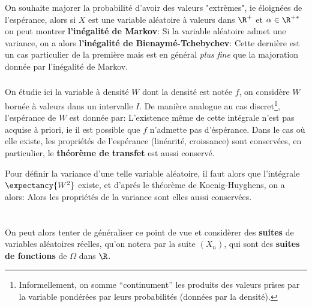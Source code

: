 \subsection*{}
On souhaite majorer la probabilité d'avoir des valeurs "extrèmes", ie éloignées de l'espérance, alors si \(X\) est une variable aléatoire à valeurs dans \(\R^+\) et \(\alpha \in \R^{+*}\) on peut montrer \textbf{l'inégalité de Markov}:
Si la variable aléatoire admet une variance, on a alors \textbf{l'inégalité de Bienaymé-Tchebychev}:
Cette dernière est un cas particulier de la première mais est en général \textit{plus fine} que la majoration donnée par l'inégalité de Markov.


\subsection*{}
On étudie ici la variable à densité \(W\) dont la densité est notée \(f\), on considère \(W\) bornée à valeurs dans un intervalle \(I\).\+
De manière analogue au cas discret\footnote[2]{Informellement, on somme ``continument'' les produits des valeurs prises par la variable pondérées par leurs probabilités (données par la densité).}, l'espérance de \(W\) est donnée par:
L'existence même de cette intégrale n'est pas acquise à priori, ie il est possible que \(f\) n'admette pas d'éspérance.
Dans le cas où elle existe, les propriétés de l'espérance (linéarité, croissance) sont conservées, en particulier, le \textbf{théorème de transfet} est aussi conservé.\<

Pour définir la variance d'une telle variable aléatoire, il faut alors que l'intégrale \(\expectancy{W^2}\) existe, et d'aprés le théorème de Koenig-Huyghens, on a alors: 
Alors les propriétés de la variance sont elles aussi conservées.
\chapter*{} %
On peut alors tenter de généraliser ce point de vue et considèrer des \textbf{suites} de variables aléatoires réelles, qu'on notera par la suite \((X_n)\), qui sont des \textbf{suites de fonctions} de \(\Omega\) dans \(\R\).\<

